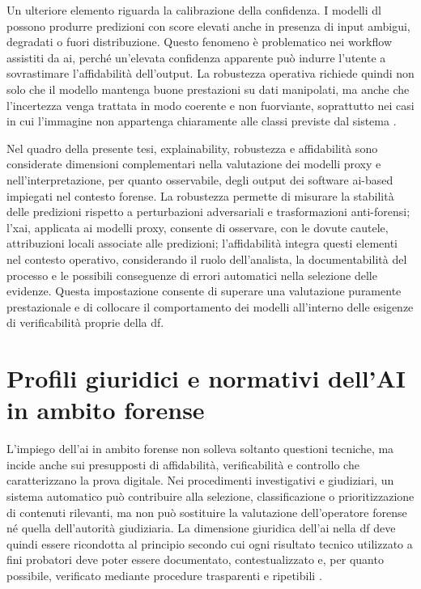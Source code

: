Un ulteriore elemento riguarda la calibrazione della confidenza. I modelli
\gls{dl} possono produrre predizioni con score elevati anche in presenza di
input ambigui, degradati o fuori distribuzione. Questo fenomeno è problematico
nei workflow assistiti da \gls{ai}, perché un'elevata confidenza apparente può
indurre l'utente a sovrastimare l'affidabilità dell'output. La robustezza
operativa richiede quindi non solo che il modello mantenga buone prestazioni su
dati manipolati, ma anche che l'incertezza venga trattata in modo coerente e non
fuorviante, soprattutto nei casi in cui l'immagine non appartenga chiaramente
alle classi previste dal sistema
\cite{hendrycks2017baseline,fort2021exploring}.

Nel quadro della presente tesi, explainability, robustezza e affidabilità sono
considerate dimensioni complementari nella valutazione dei modelli proxy e
nell'interpretazione, per quanto osservabile, degli output dei software
\gls{ai}-based impiegati nel contesto forense. La robustezza permette di
misurare la stabilità delle predizioni rispetto a perturbazioni adversariali e
trasformazioni anti-forensi; l'\gls{xai}, applicata ai modelli proxy, consente
di osservare, con le dovute cautele, attribuzioni locali associate alle
predizioni; l'affidabilità integra questi elementi nel contesto operativo,
considerando il ruolo dell'analista, la documentabilità del processo e le
possibili conseguenze di errori automatici nella selezione delle evidenze.
Questa impostazione consente di superare una valutazione puramente prestazionale
e di collocare il comportamento dei modelli all'interno delle esigenze di
verificabilità proprie della \gls{df}.


\section{Profili giuridici e normativi dell'AI in ambito forense}
\label{sec:background_legal_profiles}
L'impiego dell'\gls{ai} in ambito forense non solleva soltanto questioni tecniche, ma incide anche sui presupposti di affidabilità, verificabilità e controllo che caratterizzano la prova digitale. Nei procedimenti investigativi e giudiziari, un sistema automatico può contribuire alla selezione, classificazione o prioritizzazione di contenuti rilevanti, ma non può sostituire la valutazione dell'operatore forense né quella dell'autorità giudiziaria. La dimensione giuridica dell'\gls{ai} nella \gls{df} deve quindi essere ricondotta al principio secondo cui ogni risultato tecnico utilizzato a fini probatori deve poter essere documentato, contestualizzato e, per quanto possibile, verificato mediante procedure trasparenti e ripetibili \cite{casey2011digital,iso27037,biasiotti2018handling}.

